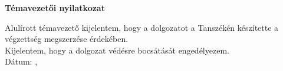 \begin{center}
\textbf{\large{Témavezetői nyilatkozat}}\\[32pt]
\end{center}

\thispagestyle{fancy}
\pagestyle{fancy}
Alulírott \mytemavezeto témavezető kijelentem, hogy a dolgozatot \mynev a \myuni \mytanszek Tanszékén készítette a \myvegzettseg végzettség megszerzése érdekében.\\

Kijelentem, hogy a dolgozat védésre bocsátását engedélyezem.\\



\vspace{2cm}
Dátum: \myvaros, \mydate\\
\vspace{2cm}

\SignatureAndDate{\mytemavezeto}
